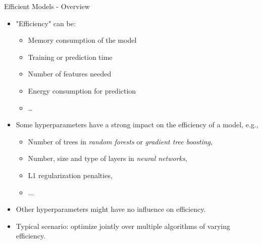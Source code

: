 \begin{frame}{Efficient Models - Overview}

\begin{itemize}
  \item "Efficiency" can be:
  \begin{itemize}
    \item Memory consumption of the model
    \item Training or prediction time
    \item Number of features needed
    \item Energy consumption for prediction
    \item \ldots
  \end{itemize}
  \item Some hyperparameters have a strong impact on the efficiency of a model, e.g.,
  \begin{itemize}
    \item Number of trees in \emph{random forests} or \emph{gradient tree boosting},
    \item Number, size and type of layers in \emph{neural networks},
    \item L1 regularization penalties,
    \item ...
  \end{itemize}
  \item Other hyperparameters might have no influence on efficiency.
  \item Typical scenario: optimize jointly over multiple algorithms of varying efficiency.
\end{itemize}

\end{frame}

